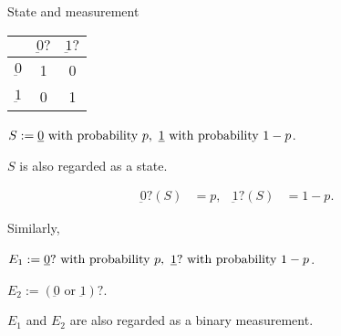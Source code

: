 \documentclass{beamer}
\newcommand\emm[1]{\textcolor{redorange}{{#1}}}
\theoremstyle{definition}
\begin{document}
\begin{frame}{State and measurement}
\begin{center}
\begin{tabular}{|c||c|c|}
\hline
& $\underbar{0}?$& $\underbar{1}?$\\
\hline
\hline
$\underbar{0}$& 1&0\\
\hline
$\underbar{1}$& 0&1\\
\hline
\end{tabular}
\end{center}

$S := \text{$\underbar{0}$ with probability $p$,\, $\underbar{1}$ with probability $1-p$}$.

$S$ is also \emm{regarded as a state}.

\begin{align*}
\underbar{0}?(S) &= p,&
\underbar{1}?(S) &= 1-p.
\end{align*}

Similarly,

$E_1 := \text{$\underbar{0}?$ with probability $p$,\, $\underbar{1}?$ with probability $1-p$}$.

$E_2 := \text{$(\underbar{0}\text{ or }\underbar{1})?$}$.

$E_1$ and $E_2$ are also \emm{regarded as a binary measurement}.

\end{frame}
\end{document}

